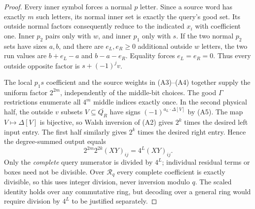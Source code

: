\documentclass[11pt]{article}
\begin{document}
\begin{proof}
Every inner symbol forces a normal $p$ letter. Since a source word
has exactly $m$ such letters, its normal inner set is exactly the
query's good set. Its outside normal factors consequently reduce to
the indicated $x_i$ with coefficient one. Inner $p_2$ pairs only with
$w$, and inner $p_1$ only with $s$. If the two normal $p_2$ sets have
sizes $a,b$, and there are $e_L,e_R\ge0$ additional outside $w$ letters,
the two run values are $b+e_L-a$ and $b-a-e_R$. Equality forces
$e_L=e_R=0$. Thus every outside opposite factor is $s+(-1)^jv$.

The local $p_1s$ coefficient and the source weights in (A3)--(A4)
together supply the uniform factor $2^{2m}$, independently of the
middle-bit choices. The good $\Gamma$ restrictions enumerate all
$4^m$ middle indices exactly once. In the second physical half,
the outside $v$ subsets $V\subseteq\overline{Q_R}$ have signs
$(-1)^{a_L\cdot\Delta[V]}$ by (A5). The map $V\mapsto\Delta[V]$
is bijective, so Walsh inversion of (A2) gives $2^k$ times the desired
left input entry. The first half similarly gives $2^k$ times the
desired right entry. Hence the degree-summed output equals
\[
 2^{2m}2^{2k}(XY)_{ij}=4^L(XY)_{ij}.                  \tag{A6}
\]
Only the \emph{complete} query numerator is divided by $4^L$;
individual residual terms or boxes need not be divisible. Over
$\mathcal R_q$ every complete coefficient is exactly divisible, so
this uses integer division, never inversion modulo $q$. The scaled
identity holds over any commutative ring, but decoding over a general
ring would require division by $4^L$ to be justified separately.
\end{proof}
\end{document}

